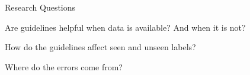 \documentclass[
    11pt,
    notheorems,
    xcolor={dvipsnames},
    hyperref={
        pdfstartview=FitH, 
        pdftitle={Ikasketa-adibide urriko Informazio-Erauzketa}, 
        pdfauthor={Oscar Sainz Jimenez}, 
        citecolor=secondary, 
    }
]{beamer}
\begin{document}


\begin{frame}
    \begin{block}{Research Questions}
        \begin{itemize}
            {
                \item Are guidelines helpful when data is available? And when it is not?
            }
            {
                \item How do the guidelines affect seen and unseen labels?
            }
            {
                \item Where do the errors come from?
            }
        \end{itemize}
    \end{block}
\end{frame}
\end{document}
